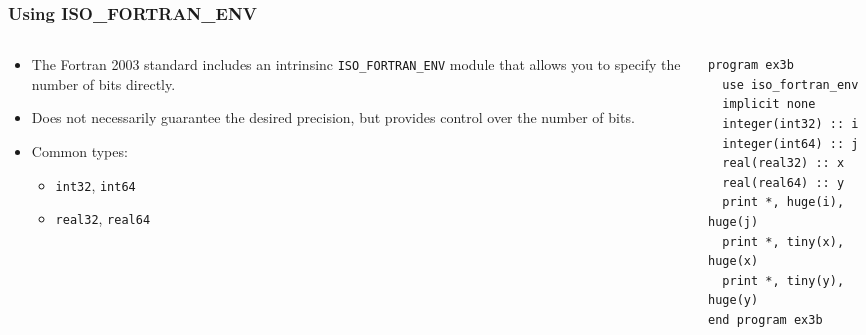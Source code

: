 \begin{frame}[fragile]
  \frametitle{Using ISO\_FORTRAN\_ENV}
  \begin{columns}[T]
    \begin{column}{0.5\textwidth}
      \begin{itemize}
      \item The Fortran 2003 standard includes an intrinsinc \texttt{ISO\_FORTRAN\_ENV} module that allows you to specify the number of bits directly.
        \item Does not necessarily guarantee the desired precision, but provides control over the number of bits.
        \item Common types:
          \begin{itemize}
            \item \texttt{int32}, \texttt{int64}
            \item \texttt{real32}, \texttt{real64}
          \end{itemize}
      \end{itemize}
    \end{column}

    \begin{column}{0.5\textwidth}
      \begin{lstlisting}
program ex3b
  use iso_fortran_env
  implicit none
  integer(int32) :: i
  integer(int64) :: j
  real(real32) :: x
  real(real64) :: y
  print *, huge(i), huge(j)
  print *, tiny(x), huge(x)
  print *, tiny(y), huge(y)
end program ex3b
      \end{lstlisting}
    \end{column}
  \end{columns}
\end{frame}


